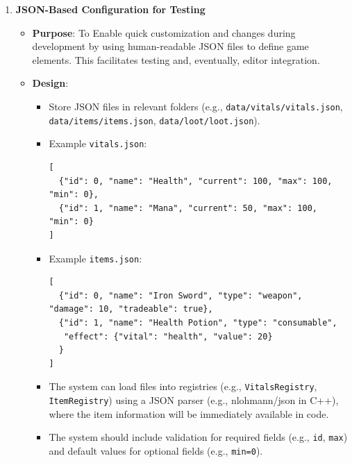 \begin{enumerate}
    \item \textbf{JSON-Based Configuration for Testing}
        \begin{itemize}
            \item \textbf{Purpose}: To Enable quick customization and changes during development by using human-readable JSON files to define game elements. This facilitates testing and, eventually, editor integration.
            \item \textbf{Design}:
                \begin{itemize}
                    \item Store JSON files in relevant folders (e.g., \texttt{data/vitals/vitals.json}, \texttt{data/items/items.json}, \texttt{data/loot/loot.json}).
                    \item Example \texttt{vitals.json}:
                    \begin{lstlisting}[style=htmlstyle]
[
  {"id": 0, "name": "Health", "current": 100, "max": 100, "min": 0},
  {"id": 1, "name": "Mana", "current": 50, "max": 100, "min": 0}
]
                    \end{lstlisting}
                    \item Example \texttt{items.json}:
                    \begin{lstlisting}[style=htmlstyle]
[
  {"id": 0, "name": "Iron Sword", "type": "weapon", "damage": 10, "tradeable": true},
  {"id": 1, "name": "Health Potion", "type": "consumable", 
   "effect": {"vital": "health", "value": 20}
  }
]
                    \end{lstlisting}
                    \item The system can load files into registries (e.g., \texttt{VitalsRegistry}, \texttt{ItemRegistry}) using a JSON parser (e.g., nlohmann/json in C++), where the item information will be immediately available in code.
                    \item The system should include validation for required fields (e.g., \texttt{id}, \texttt{max}) and default values for optional fields (e.g., \texttt{min=0}).
                \end{itemize}
        \end{itemize}


\end{enumerate}
